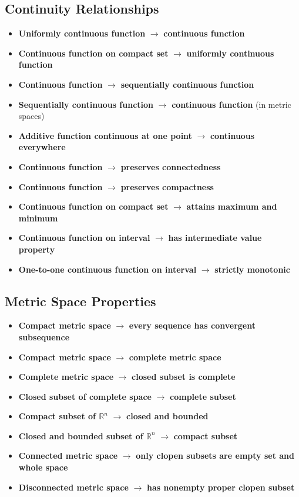 \subsection*{Continuity Relationships}

\begin{itemize}
\item \textbf{Uniformly continuous function} $\rightarrow$ \textbf{continuous function}
\item \textbf{Continuous function on compact set} $\rightarrow$ \textbf{uniformly continuous function}
\item \textbf{Continuous function} $\rightarrow$ \textbf{sequentially continuous function}
\item \textbf{Sequentially continuous function} $\rightarrow$ \textbf{continuous function} (in metric spaces)
\item \textbf{Additive function continuous at one point} $\rightarrow$ \textbf{continuous everywhere}
\item \textbf{Continuous function} $\rightarrow$ \textbf{preserves connectedness}
\item \textbf{Continuous function} $\rightarrow$ \textbf{preserves compactness}
\item \textbf{Continuous function on compact set} $\rightarrow$ \textbf{attains maximum and minimum}
\item \textbf{Continuous function on interval} $\rightarrow$ \textbf{has intermediate value property}
\item \textbf{One-to-one continuous function on interval} $\rightarrow$ \textbf{strictly monotonic}
\end{itemize}

\subsection*{Metric Space Properties}

\begin{itemize}
\item \textbf{Compact metric space} $\rightarrow$ \textbf{every sequence has convergent subsequence}
\item \textbf{Compact metric space} $\rightarrow$ \textbf{complete metric space}
\item \textbf{Complete metric space} $\rightarrow$ \textbf{closed subset is complete}
\item \textbf{Closed subset of complete space} $\rightarrow$ \textbf{complete subset}
\item \textbf{Compact subset of $\mathbb{R}^n$} $\rightarrow$ \textbf{closed and bounded}
\item \textbf{Closed and bounded subset of $\mathbb{R}^n$} $\rightarrow$ \textbf{compact subset}
\item \textbf{Connected metric space} $\rightarrow$ \textbf{only clopen subsets are empty set and whole space}
\item \textbf{Disconnected metric space} $\rightarrow$ \textbf{has nonempty proper clopen subset}
\end{itemize}

